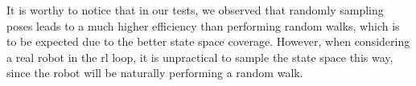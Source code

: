 It is worthy to notice that in our tests, we observed that randomly sampling poses leads to a much higher efficiency than performing random walks, which is to be expected due to the better state space coverage. 
%
However, when considering a real robot in the \gls{rl} loop, it is unpractical to sample the state space this way, since the robot will be naturally performing a random walk.
%
